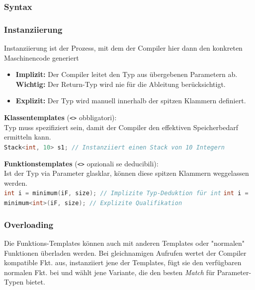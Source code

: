 \begin{center}
\end{center}

\subsubsection{Syntax}

\vspace{-0.5em}

\subsubsection{Instanziierung}

Instanziierung ist der Prozess, mit dem der Compiler hier dann den konkreten Maschinencode generiert\smallbreak

\begin{itemize}
    \item \textbf{Implizit:} Der Compiler leitet den Typ aus übergebenen Parametern ab. \textbf{Wichtig:} Der Return-Typ wird nie für die Ableitung berücksichtigt.
    \item \textbf{Explizit:} Der Typ wird manuell innerhalb der spitzen Klammern definiert.
\end{itemize}\smallbreak

\textbf{Klassentemplates} (\verb|<>| obbligatori):\\
Typ muss spezifiziert sein, damit der Compiler den effektiven Speicherbedarf ermitteln kann.\\
\lstinline[language=C++]|Stack<int, 10> s1; // Instanziiert einen Stack von 10 Integern|

\textbf{Funktionstemplates} (\verb|<>| opzionali se deducibili):\\
Ist der Typ via Parameter glasklar, können diese spitzen Klammern weggelassen werden.\\
\lstinline[language=C++]|int i = minimum(iF, size); // Implizite Typ-Deduktion für int|
\lstinline[language=C++]|int i = minimum<int>(iF, size); // Explizite Qualifikation|
\subsubsection{Overloading}

Die Funktions-Templates können auch mit anderen Templates oder "normalen" Funktionen überladen werden. 
Bei gleichnamigen Aufrufen wertet der Compiler kompatible Fkt. aus, instanziiert jene der Templates, fügt sie den verfügbaren normalen Fkt. bei und wählt jene Variante, die den besten \textit{Match} für Parameter-Typen bietet. 

